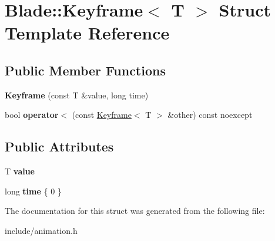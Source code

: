 \hypertarget{struct_blade_1_1_keyframe}{}\section{Blade\+:\+:Keyframe$<$ T $>$ Struct Template Reference}
\label{struct_blade_1_1_keyframe}
\subsection*{Public Member Functions}
\begin{DoxyCompactItemize}
\item 
\mbox{\label{struct_blade_1_1_keyframe_a4b029db69ce697cd72f56f254fd46d25}} 
{\bfseries Keyframe} (const T \&value, long time)
\item 
\mbox{\label{struct_blade_1_1_keyframe_a09d3923717595ce20fb376e784c54bca}} 
bool {\bfseries operator$<$} (const \hyperlink{struct_blade_1_1_keyframe}{Keyframe}$<$ T $>$ \&other) const noexcept
\end{DoxyCompactItemize}
\subsection*{Public Attributes}
\begin{DoxyCompactItemize}
\item 
\mbox{\label{struct_blade_1_1_keyframe_a2d896842fbf8bb467a886e5cf84ee963}} 
T {\bfseries value}
\item 
\mbox{\label{struct_blade_1_1_keyframe_a3cca9ffb7f55931ad5b6a3bf6a23c512}} 
long {\bfseries time} \{ 0 \}
\end{DoxyCompactItemize}


The documentation for this struct was generated from the following file\+:\begin{DoxyCompactItemize}
\item 
include/animation.\+h\end{DoxyCompactItemize}
